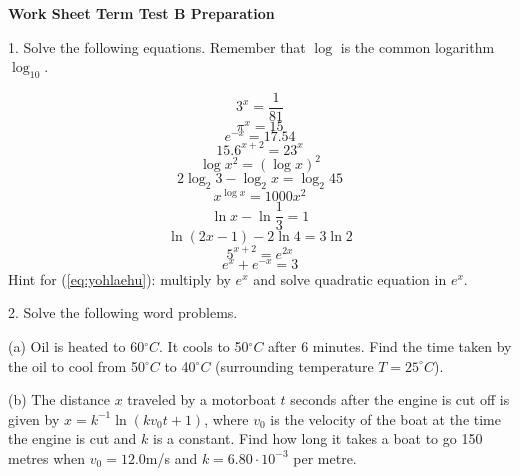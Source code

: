 \documentclass[11pt]{article}
\begin{document}
\textbf{Work Sheet Term Test B Preparation}

1. Solve the following equations. Remember that $\log$ is the common
logarithm $\log_{10}$. 

\begin{equation}
  \label{eq:vibeibie}
3^{x}=\frac{1}{81}
\end{equation}
\begin{equation}
  \label{eq:gofushoo}
\pi^{x}=15
\end{equation}
\begin{equation}
  \label{eq:aepheipi}
e^{-x}=17.54
\end{equation}
\begin{equation}
  \label{eq:ohwoojie}
15.6^{x+2}=23^{x}
\end{equation}
\begin{equation}
  \label{eq:vogeobab}
\log{}x^{2}=(\log{}x)^{2}
\end{equation}
\begin{equation}
  \label{eq:mahbeizo}
2\log_{2}3-\log_{2}x=\log_{2}45
\end{equation}
\begin{equation}
  \label{eq:chohtohk}
x^{\log{}x}=1000x^{2}
\end{equation}
\begin{equation}
  \label{eq:ohdiedoe}
\ln{}x-\ln\frac{1}{3}=1
\end{equation}
\begin{equation}
  \label{eq:pohkaith}
\ln(2x-1)-2\ln{}4=3\ln{}2
\end{equation}
\begin{equation}
  \label{eq:aejaiquo}
5^{x+2}=e^{2x}
\end{equation}
\begin{equation}
  \label{eq:yohlaehu}
e^{x}+e^{-x}=3
\end{equation}
Hint for (\ref{eq:yohlaehu}): multiply by $e^{x}$ and solve quadratic
equation in $e^{x}$.

2. Solve the following word problems.

(a) Oil is heated to 60$^{\circ}C$. It cools to 50$^{\circ}C$ after 6
minutes. Find the time taken by the oil to cool from 50$^{\circ}C$ to
40$^{\circ}C$ (surrounding temperature $T=25^{\circ}C$).

(b) The distance $x$ traveled by a motorboat $t$ seconds after the
engine is cut off is given by $x=k^{-1}\ln(kv_{0}t+1)$, where $v_{0}$
is the velocity of the boat at the time the engine is cut and $k$ is a
constant. Find how long it takes a boat to go 150 metres when
$v_{0}=12.0$m/s and $k=6.80\cdot{}10^{-3}$ per metre.
\end{document}
